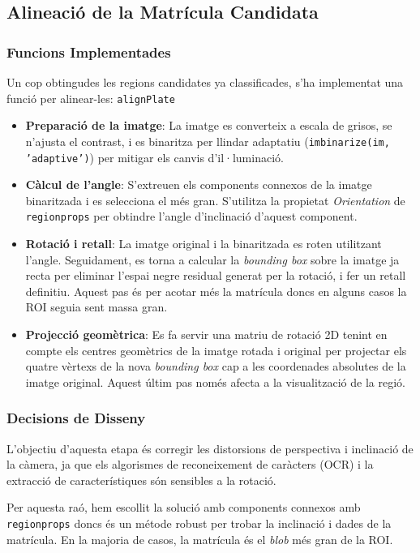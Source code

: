 
\subsection{Alineació de la Matrícula Candidata}

\subsubsection{Funcions Implementades}
Un cop obtingudes les regions candidates ya classificades, s'ha implementat una funció per alinear-les: \texttt{alignPlate}

\begin{itemize}
    \item \textbf{Preparació de la imatge}: La imatge es converteix a escala de grisos, se n'ajusta el contrast,  i es binaritza per llindar adaptatiu (\texttt{imbinarize(im, 'adaptive')}) per mitigar els canvis d'il·luminació.
    \item \textbf{Càlcul de l'angle}: S'extreuen els components connexos de la imatge binaritzada i es selecciona el més gran. S'utilitza la propietat \textit{Orientation} de \texttt{regionprops} per obtindre l'angle d'inclinació d'aquest component.
    \item \textbf{Rotació i retall}: La imatge original i la binaritzada es roten utilitzant l'angle. Seguidament, es torna a calcular la \textit{bounding box} sobre la imatge ja recta per eliminar l'espai negre residual generat per la rotació, i fer un retall definitiu. Aquest pas és per acotar més la matrícula doncs en alguns casos la ROI seguia sent massa gran.
    \item \textbf{Projecció geomètrica}: Es fa servir una matriu de rotació 2D tenint en compte els centres geomètrics de la imatge rotada i original per projectar els quatre vèrtexs de la nova \textit{bounding box} cap a les coordenades absolutes de la imatge original. Aquest últim pas només afecta a la visualització de la regió.
\end{itemize}
\subsubsection{Decisions de Disseny}
L'objectiu d'aquesta etapa és corregir les distorsions de perspectiva i inclinació de la càmera, ja que els algorismes de reconeixement de caràcters (OCR) i la extracció de característiques són sensibles a la rotació.

Per aquesta raó, hem escollit la solució amb components connexos amb \texttt{regionprops} doncs és un métode robust per trobar la inclinació i dades de la matrícula. En la majoria de casos, la matrícula és el \textit{blob} més gran de la ROI.

